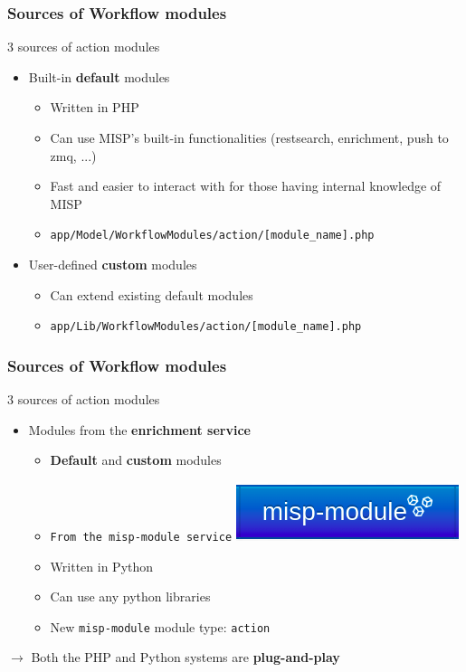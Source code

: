 \begin{frame}
    \frametitle{Sources of Workflow modules}
    3 sources of action modules
    \begin{itemize}
        \item Built-in \textbf{default} modules
        \begin{itemize}
            \item Written in PHP
            \item Can use MISP's built-in functionalities (restsearch, enrichment, push to zmq, ...)
            \item Fast and easier to interact with for those having internal knowledge of MISP
            \item \texttt{\scriptsize app/Model/WorkflowModules/action/[module\_name].php}
        \end{itemize}
        \item User-defined \textbf{custom} modules
        \begin{itemize}
            \item Can extend existing default modules
            \item \texttt{\scriptsize app/Lib/WorkflowModules/action/[module\_name].php}
        \end{itemize}
    \end{itemize}
\end{frame}

\begin{frame}
    \frametitle{Sources of Workflow modules}
    3 sources of action modules
    \begin{itemize}
        \item Modules from the \textbf{enrichment service}
        \begin{itemize}
            \item \textbf{Default} and \textbf{custom} modules
            \item \texttt{From the misp-module service} \includegraphics[width=0.25\linewidth]{pictures/misp-module-icon.png}
            \item Written in Python
            \item Can use any python libraries
            \item New \texttt{misp-module} module type: \texttt{action}
        \end{itemize}
    \end{itemize}
    \vspace{1em}
    \begin{center}
        $\rightarrow$ Both the PHP and Python systems are \textbf{plug-and-play}
    \end{center}
\end{frame}

